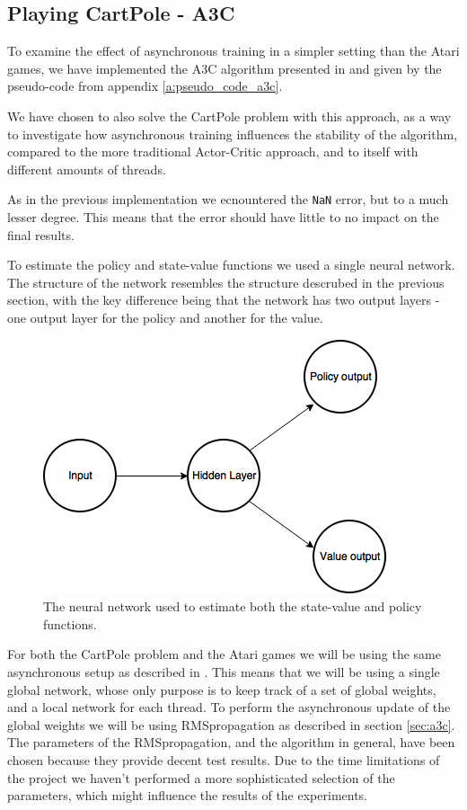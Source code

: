 \documentclass[11pt]{article}
\begin{document}
\subsection{Playing CartPole - A3C}

To examine the effect of asynchronous training in a simpler setting than
the Atari games, we have implemented the A3C algorithm presented
in \cite{a3c} and given by the pseudo-code from appendix \ref{a:pseudo_code_a3c}.

We have chosen to also solve the CartPole problem with this approach, as a way to
investigate how asynchronous training influences the stability of the algorithm,
compared to the more traditional Actor-Critic approach, and 
to itself with different amounts of threads.

As in the previous implementation we ecnountered the \texttt{NaN} error,
but to a much lesser degree.
This means that the error should have little to no impact on
the final results.

To estimate the policy and state-value functions we used a single
neural network.
The structure of the network resembles the structure descrubed in the previous section, 
with the key difference being that the network has two output layers -
one output layer for the policy and another for the value.

\begin{figure}[H]
    \centering
    \includegraphics[scale=0.5]{include/shared_cartpole.png}
    \caption{The neural network used to estimate both the state-value
             and policy functions.}
    \label{fig:s_cartpole}
\end{figure}

For both the CartPole problem and the Atari games we will be using the same asynchronous setup
as described in \cite{a3c}.
This means that we will be using a single global network, whose only
purpose is to keep track of a set of global weights, and a local network
for each thread.
To perform the asynchronous update of the global weights we will be using
RMSpropagation as described in section \ref{sec:a3c}.
The parameters of the RMSpropagation, and the algorithm in general, have
been chosen because they provide decent test results.
Due to the time limitations of the project we haven't performed
a more sophisticated selection of the parameters, which might
influence the results of the experiments.
\end{document}
